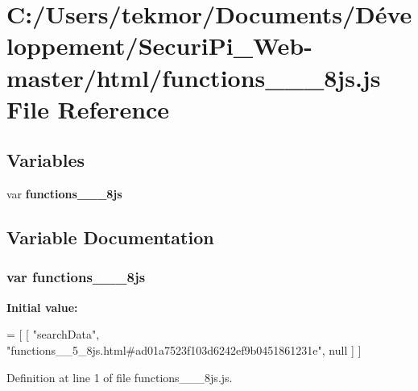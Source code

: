 \section{C\+:/\+Users/tekmor/\+Documents/\+Développement/\+Securi\+Pi\+\_\+\+Web-\/master/html/functions\+\_\+\+\_\+\_\+8js.js File Reference}
\label{functions____5__8js_8js}
\subsection*{Variables}
\begin{DoxyCompactItemize}
\item 
var {\bf functions\+\_\+\+\_\+\_\+8js}
\end{DoxyCompactItemize}


\subsection{Variable Documentation}
\subsubsection[{functions\+\_\+\+\_\+5\+\_\+8js}]{\setlength{\rightskip}{0pt plus 5cm}var functions\+\_\+\+\_\+\_\+8js}\label{functions____5__8js_8js_af3b4080b1309a8c39ed47a03b026edfd}
{\bfseries Initial value\+:}
\begin{DoxyCode}
=
[
    [ \textcolor{stringliteral}{"searchData"}, \textcolor{stringliteral}{"functions\_\_5\_8js.html#ad01a7523f103d6242ef9b0451861231e"}, null ]
]
\end{DoxyCode}


Definition at line 1 of file functions\+\_\+\+\_\+\_\+8js.\+js.

